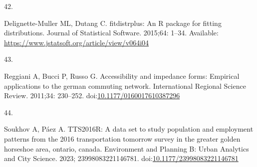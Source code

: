 \documentclass[10pt,letterpaper]{article}
\newlength{\cslhangindent}
\newlength{\csllabelwidth}
\newlength{\cslentryspacingunit} %
\newenvironment{CSLReferences}[2] %
 {%
  \setlength{\parindent}{0pt}
  \ifodd #1
  \let\oldpar\par
  \def\par{\hangindent=\cslhangindent\oldpar}
  \fi
  \setlength{\parskip}{#2\cslentryspacingunit}
 }%
 {}
\newcommand{\CSLLeftMargin}[1]{\parbox[t]{\csllabelwidth}{#1}}
\newcommand{\CSLRightInline}[1]{\parbox[t]{\linewidth - \csllabelwidth}{#1}\break}
\begin{document}
\begin{CSLReferences}{0}{0}
\leavevmode{}%
\CSLLeftMargin{42. }%
\CSLRightInline{Delignette-Muller ML, Dutang C. {fitdistrplus}: An {R}
package for fitting distributions. Journal of Statistical Software.
2015;64: 1--34. Available:
\url{https://www.jstatsoft.org/article/view/v064i04}}

\leavevmode{}%
\CSLLeftMargin{43. }%
\CSLRightInline{Reggiani A, Bucci P, Russo G. Accessibility and
impedance forms: Empirical applications to the german commuting network.
International Regional Science Review. 2011;34: 230--252.
doi:\href{https://doi.org/10.1177/0160017610387296}{10.1177/0160017610387296}}

\leavevmode{}%
\CSLLeftMargin{44. }%
\CSLRightInline{Soukhov A, Páez A. {TTS}2016R: A data set to study
population and employment patterns from the 2016 transportation tomorrow
survey in the greater golden horseshoe area, ontario, canada.
Environment and Planning B: Urban Analytics and City Science. 2023;
23998083221146781.
doi:\href{https://doi.org/10.1177/23998083221146781}{10.1177/23998083221146781}}

\end{CSLReferences}

\nolinenumbers
\end{document}
